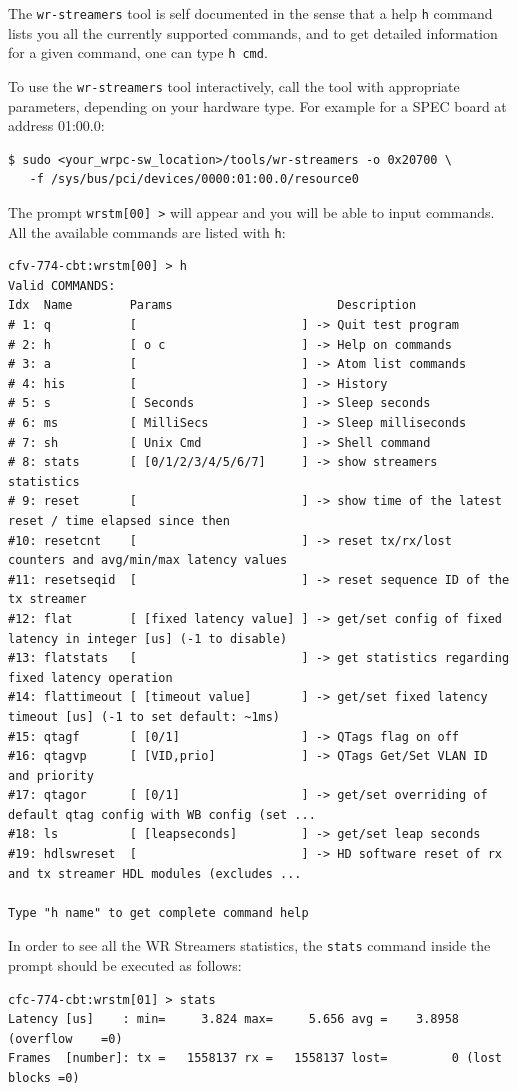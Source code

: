 \documentclass[a4paper, 12pt]{article}
\renewcommand{\_}{\underscore\allowbreak}
\begin{document}
The \texttt{wr-streamers} tool is self documented in the sense that a help
\texttt{h} command lists you all the currently supported commands, and to get
detailed information for a given command, one can type \texttt{h cmd}. 

To use the \texttt{wr-streamers} tool interactively, call the tool with appropriate
parameters, depending on your hardware type. For example for a SPEC board at
address 01:00.0:
\begin{lstlisting}
$ sudo <your_wrpc-sw_location>/tools/wr-streamers -o 0x20700 \
   -f /sys/bus/pci/devices/0000:01:00.0/resource0
\end{lstlisting}

The prompt \texttt{wrstm[00] >} will appear and you will be able to input commands.
All the available commands are listed with \texttt{h}:
\begin{lstlisting}[basicstyle=\scriptsize\ttfamily]
cfv-774-cbt:wrstm[00] > h
Valid COMMANDS:
Idx  Name        Params                       Description
# 1: q           [                       ] -> Quit test program
# 2: h           [ o c                   ] -> Help on commands
# 3: a           [                       ] -> Atom list commands
# 4: his         [                       ] -> History
# 5: s           [ Seconds               ] -> Sleep seconds
# 6: ms          [ MilliSecs             ] -> Sleep milliseconds
# 7: sh          [ Unix Cmd              ] -> Shell command
# 8: stats       [ [0/1/2/3/4/5/6/7]     ] -> show streamers statistics
# 9: reset       [                       ] -> show time of the latest reset / time elapsed since then
#10: resetcnt    [                       ] -> reset tx/rx/lost counters and avg/min/max latency values
#11: resetseqid  [                       ] -> reset sequence ID of the tx streamer
#12: flat        [ [fixed latency value] ] -> get/set config of fixed latency in integer [us] (-1 to disable)
#13: flatstats   [                       ] -> get statistics regarding fixed latency operation
#14: flattimeout [ [timeout value]       ] -> get/set fixed latency timeout [us] (-1 to set default: ~1ms)
#15: qtagf       [ [0/1]                 ] -> QTags flag on off
#16: qtagvp      [ [VID,prio]            ] -> QTags Get/Set VLAN ID and priority
#17: qtagor      [ [0/1]                 ] -> get/set overriding of default qtag config with WB config (set ...
#18: ls          [ [leapseconds]         ] -> get/set leap seconds
#19: hdlswreset  [                       ] -> HD software reset of rx and tx streamer HDL modules (excludes ...

Type "h name" to get complete command help
\end{lstlisting}
In order to see all the WR Streamers statistics, the \texttt{stats} command
inside the prompt should be executed as follows:
\begin{lstlisting}
cfc-774-cbt:wrstm[01] > stats
Latency [us]    : min=     3.824 max=     5.656 avg =    3.8958 (overflow    =0)
Frames  [number]: tx =   1558137 rx =   1558137 lost=         0 (lost blocks =0)

\end{lstlisting}
\end{document}
